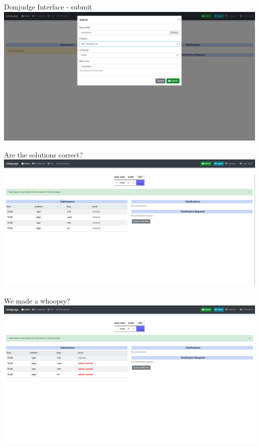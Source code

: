 \documentclass[11pt,pdf, aspectratio=169]{beamer}
\begin{document}
  \begin{frame}{Domjudge Interface - submit}
    \includegraphics[width=\linewidth]{images/session-1/domjudge-submit}
  \end{frame}
  \begin{frame}{Are the solutions correct?}
    \includegraphics[width=\linewidth]{images/session-1/domjudge-submit-first-try}
  \end{frame}
  \begin{frame}{We made a whoopsy?}
    \includegraphics[width=\linewidth]{images/session-1/domjudge-no-double}
  \end{frame}
\end{document}
